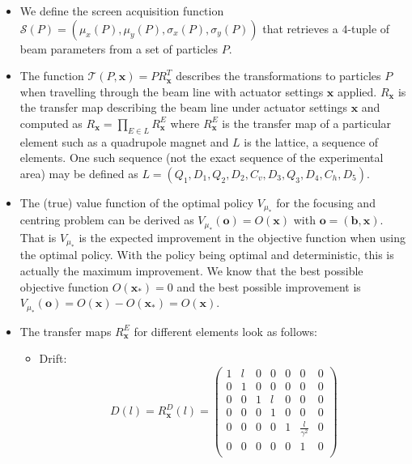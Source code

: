 \begin{itemize}
    \item We define the screen acquisition function $\mathcal{S}(P) = (\mu_x(P), \mu_y(P), \sigma_x(P), \sigma_y(P))$ that retrieves a $4$-tuple of beam parameters from a set of particles $P$.
    \item The function $\mathcal{T}(P, \bm{x}) = PR_{\bm{x}}^T$ describes the transformations to particles $P$ when travelling through the beam line with actuator settings $\bm{x}$ applied. $R_{\bm{x}}$ is the transfer map describing the beam line under actuator settings $\bm{x}$ and computed as $R_{\bm{x}} = \prod_{E \in L} R_{\bm{x}}^{E}$ where $R_{\bm{x}}^{E}$ is the transfer map of a particular element such as a quadrupole magnet and $L$ is the lattice, a sequence of elements. One such sequence (not the exact sequence of the experimental area) may be defined as $L = (Q_1, D_1, Q_2, D_2, C_v, D_3, Q_3, D_4, C_h, D_5)$.
    \item The (true) value function of the optimal policy $V_{\mu_*}$ for the focusing and centring problem can be derived as $V_{\mu_*}(\bm{o}) = O(\bm{x})$ with $\bm{o} = (\bm{b}, \bm{x})$. That is $V_{\mu_*}$ is the expected improvement in the objective function when using the optimal policy. With the policy being optimal and deterministic, this is actually the maximum improvement. We know that the best possible objective function $O(\bm{x}_*) = 0$ and the best possible improvement is $V_{\mu_*}(\bm{o}) = O(\bm{x}) - O(\bm{x}_*) = O(\bm{x})$.
    \item The transfer maps $R_{\bm{x}}^{E}$ for different elements look as follows:
    \begin{itemize}
        \item Drift:
            \begin{equation*}
                D(l) = R_{\bm{x}}^D(l) = \begin{pmatrix}
                                             1 & l & 0 & 0 & 0 & 0 & 0 \\ %
                                             0 & 1 & 0 & 0 & 0 & 0 & 0 \\ %
                                             0 & 0 & 1 & l & 0 & 0 & 0 \\ %
                                             0 & 0 & 0 & 1 & 0 & 0 & 0 \\ %
                                             0 & 0 & 0 & 0 & 1 & \frac{l}{\gamma^2} & 0 \\ %
                                             0 & 0 & 0 & 0 & 0 & 1 & 0 \\ %

\end{pmatrix}
\end{equation*}
\end{itemize}
\end{itemize}
